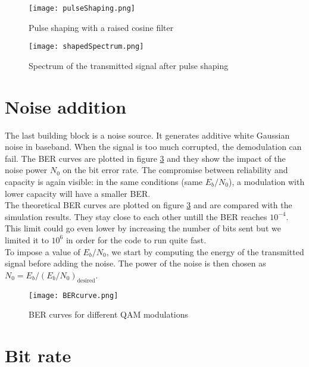 \begin{figure}[H]
    \centering
    \texttt{[image: pulseShaping.png]}
    \caption{Pulse shaping with a raised cosine filter}
    \label{fig:pulseShaping}
\end{figure}

\begin{figure}[H]
    \centering
    \texttt{[image: shapedSpectrum.png]}
    \caption{Spectrum of the transmitted signal after pulse shaping}
    \label{fig:shapedSpectrum}
\end{figure}

\section{Noise addition}

The last building block is a noise source. It generates additive white Gaussian noise in baseband. When the signal is too much corrupted, the demodulation can fail. The BER curves are plotted in figure \ref{fig:BER} and they show the impact of the noise power $N_0$ on the bit error rate. The compromise between reliability and capacity is again visible: in the same conditions (same $E_b/N_0$), a modulation with lower capacity will have a smaller BER. \\

The theoretical BER curves are plotted on figure \ref{fig:BER} and are compared with the simulation results. They stay close to each other untill the BER reaches $10^{-4}$. This limit could go even lower by increasing the number of bits sent but we limited it to $10^6$ in order for the code to run quite fast. \\

To impose a value of $E_b/N_0$, we start by computing the energy of the transmitted signal before adding the noise. The power of the noise is then chosen as $N_0 = E_b / (E_b/N_0)_{\text{desired}}$. \\

\begin{figure}[H]
    \centering
    \texttt{[image: BERcurve.png]}
    \caption{BER curves for different QAM modulations}
    \label{fig:BER}
\end{figure}

\section{Bit rate}

